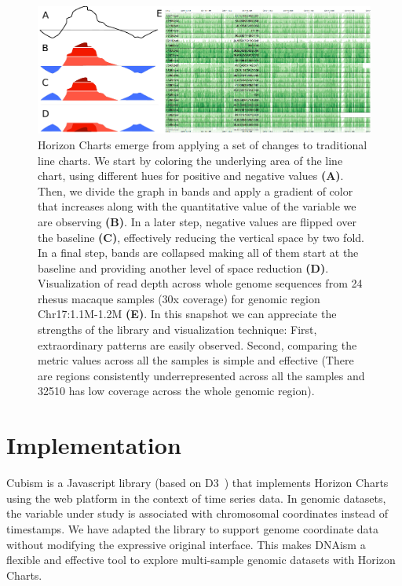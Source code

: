 \documentclass{bioinfo}
\begin{document}
\begin{figure}
\centerline{\includegraphics{figure.pdf}}
\caption{
Horizon Charts emerge from applying a set of changes to
traditional line charts. We start by coloring the underlying area of the line
chart, using different hues for positive and negative values \textbf{(A)}. Then, we
divide the graph in bands and apply a gradient of color that increases along
with the quantitative value of the variable we are observing \textbf{(B)}. In a later
step, negative values are flipped over the baseline \textbf{(C)}, effectively
reducing the vertical space by two fold. In a final step, bands are collapsed
making all of them start at the baseline and providing another level of space
reduction \textbf{(D)}.  Visualization of read depth across whole genome sequences from
24 rhesus macaque samples (30x coverage) for genomic region Chr17:1.1M-1.2M
\textbf{(E)}. In this snapshot we can appreciate the strengths of the library and
visualization technique: First, extraordinary patterns are easily observed.
Second, comparing the metric values across all the samples is simple and
effective (There are regions consistently underrepresented across all the
samples and 32510 has low coverage across the whole genomic region).
}\label{fig:01}
\end{figure}



\section{Implementation}

Cubism is a Javascript library (based on D3~\citep{2011-d3}) that implements
Horizon Charts using the web platform in the context of time series data. In
genomic datasets, the variable under study is associated with chromosomal
coordinates instead of timestamps. We have adapted the library to support
genome coordinate data without modifying the expressive original interface.
This makes DNAism a flexible and effective tool to explore multi-sample genomic
datasets with Horizon Charts.
\end{document}
